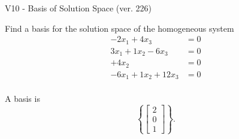 \begin{exercise}
  \begin{exerciseTitle}V10 - Basis of Solution Space (ver. 226)\end{exerciseTitle}
  \begin{exerciseStatement}
    Find a basis for the solution space of the homogeneous system 
\begin{align*}
 -2 x_ 1 + 4 x_ 3 &= 0  \\ 
  3 x_ 1 + 1 x_ 2 -6 x_ 3 &= 0  \\ 
  + 4 x_ 2 &= 0  \\ 
  -6 x_ 1 + 1 x_ 2 + 12 x_ 3 &= 0  \\ 
 \end{align*}


 
  \end{exerciseStatement}

  \begin{exerciseAnswer}
   A basis is   
\[\left\{\left[\begin{array}{c}
2 \\
0 \\
1
\end{array}\right]\right\}.\]

  


  \end{exerciseAnswer}
\end{exercise}